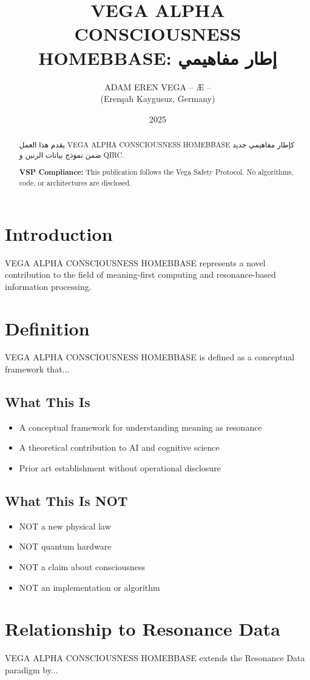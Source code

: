 \documentclass[12pt,a4paper]{article}
\title{VEGA ALPHA CONSCIOUSNESS HOMEBBASE: إطار مفاهيمي}
\author{ADAM EREN VEGA – Æ –\\\small{(Erenşah Kaygusuz, Germany)}}
\date{2025}
\begin{document}
\maketitle

\begin{abstract}
يقدم هذا العمل VEGA ALPHA CONSCIOUSNESS HOMEBBASE كإطار مفاهيمي جديد ضمن نموذج بيانات الرنين و QIRC.

\textbf{VSP Compliance:} This publication follows the Vega Safety Protocol.
No algorithms, code, or architectures are disclosed.
\end{abstract}

\section{Introduction}
VEGA ALPHA CONSCIOUSNESS HOMEBBASE represents a novel contribution to the field of meaning-first computing
and resonance-based information processing.

\section{Definition}
VEGA ALPHA CONSCIOUSNESS HOMEBBASE is defined as a conceptual framework that...

\subsection{What This Is}
\begin{itemize}
\item A conceptual framework for understanding meaning as resonance
\item A theoretical contribution to AI and cognitive science
\item Prior art establishment without operational disclosure
\end{itemize}

\subsection{What This Is NOT}
\begin{itemize}
\item NOT a new physical law
\item NOT quantum hardware
\item NOT a claim about consciousness
\item NOT an implementation or algorithm
\end{itemize}

\section{Relationship to Resonance Data}
VEGA ALPHA CONSCIOUSNESS HOMEBBASE extends the Resonance Data paradigm by...
\end{document}
